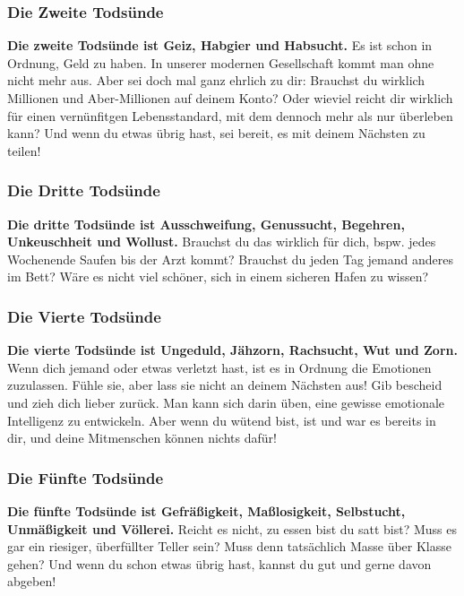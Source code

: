 \documentclass[12pt,a5paper]{article}
\begin{document}
	\subsubsection{Die Zweite Tods\"unde}
		\textbf{Die zweite Tods\"unde ist Geiz,
		Habgier und Habsucht.}
		Es ist schon in Ordnung,
		Geld zu haben.
		In unserer modernen Gesellschaft kommt man ohne nicht mehr aus.
		Aber sei doch mal ganz ehrlich zu dir:
		Brauchst du wirklich Millionen und Aber-Millionen auf deinem Konto?
		Oder wieviel reicht dir wirklich f\"ur einen vern\"unfitgen Lebensstandard,
		mit dem dennoch mehr als nur \"uberleben kann?
		Und wenn du etwas \"ubrig hast,
		sei bereit,
		es mit deinem N\"achsten zu teilen!
	
	\subsubsection{Die Dritte Tods\"unde}
		\textbf{Die dritte Tods\"unde ist Ausschweifung,
		Genussucht,
		Begehren,
		Unkeuschheit und Wollust.}
		Brauchst du das wirklich f\"ur dich,
		bspw. jedes Wochenende Saufen bis der Arzt kommt?
		Brauchst du jeden Tag jemand anderes im Bett?
		W\"are es nicht viel sch\"oner,
		sich in einem sicheren Hafen zu wissen?
	
	\subsubsection{Die Vierte Tods\"unde}
		\textbf{Die vierte Tods\"unde ist Ungeduld,
		J\"ahzorn,
		Rachsucht,
		Wut und Zorn.}
		Wenn dich jemand oder etwas verletzt hast,
		ist es in Ordnung die Emotionen zuzulassen.
		F\"uhle sie,
		aber lass sie nicht an deinem N\"achsten aus!
		Gib bescheid und zieh dich lieber zur\"uck.
		Man kann sich darin \"uben,
		eine gewisse emotionale Intelligenz zu entwickeln.
		Aber wenn du w\"utend bist,
		ist und war es bereits in dir,
		und deine Mitmenschen k\"onnen nichts daf\"ur!

	\subsubsection{Die F\"unfte Tods\"unde}
		\textbf{Die f\"unfte Tods\"unde ist Gefr\"a{\ss}igkeit,
		Ma{\ss}losigkeit,
		Selbstucht,
		Unm\"a{\ss}igkeit und V\"ollerei.}
		Reicht es nicht,
		zu essen bist du satt bist?
		Muss es gar ein riesiger,
		\"uberf\"ullter Teller sein?
		Muss denn tats\"achlich Masse \"uber Klasse gehen?
		Und wenn du schon etwas \"ubrig hast,
		kannst du gut und gerne davon abgeben!
	
\end{document}
